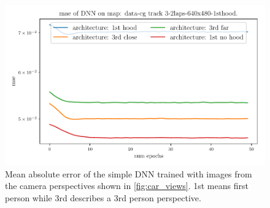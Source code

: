 \documentclass[10pt,a4paper,twoside,journal]{IEEEtran}
\begin{document}
\begin{figure}[ht]
	\centering
	\includegraphics[width=\columnwidth]{attachments/simple-val_mae-perspective_comp-30567-31159-31785-32414.pdf}
	\caption{Mean absolute error of the simple DNN trained with images from the camera perspectives shown in \autoref{fig:car_views}. 1st means first person while 3rd describes a 3rd person perspective.}
	\label{fig:camera-evaluation}
\end{figure}
\end{document}
